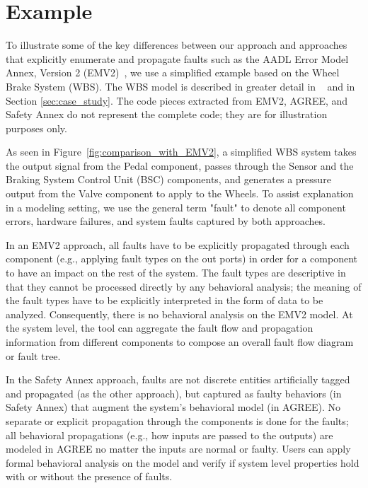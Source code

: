 \section{Example}
\label{sec:comparison_with_EMV2}

To illustrate some of the key differences between our approach and approaches that explicitly enumerate and propagate faults such as the AADL Error Model Annex, Version 2 (EMV2)~\cite{EMV2}, we use a simplified example based on the Wheel Brake System (WBS). The WBS model is described in greater detail in ~\cite{Stewart17:IMBSA} and in Section \ref{sec:case_study}. The code pieces extracted from EMV2, AGREE, and Safety Annex do not represent the complete code; they are for illustration purposes only.

As seen in Figure~\ref{fig:comparison_with_EMV2}, a simplified WBS system takes the output signal from the Pedal component, passes through the Sensor and the Braking System Control Unit (BSC) components, and generates a pressure output from the Valve component to apply to the Wheels. To assist explanation in a modeling setting, we use the general term "fault" to denote all component errors, hardware failures, and system faults captured by both approaches.

In an EMV2 approach, all faults have to be explicitly propagated through each component (e.g., applying fault types on the out ports) in order for a component to have an impact on the rest of the system. The fault types are descriptive in that they cannot be processed directly by any behavioral analysis; the meaning of the fault types have to be explicitly interpreted in the form of data to be analyzed. Consequently, there is no behavioral analysis on the EMV2 model. At the system level, the tool can aggregate the fault flow and propagation information from different components to compose an overall fault flow diagram or fault tree.

In the Safety Annex approach, faults are not discrete entities artificially tagged and propagated (as the other approach), but captured as faulty behaviors (in Safety Annex) that augment the system's behavioral model (in AGREE). No separate or explicit propagation through the components is done for the faults; all behavioral propagations (e.g., how inputs are passed to the outputs) are modeled in AGREE no matter the inputs are normal or faulty. Users can apply formal behavioral analysis on the model and verify if system level properties hold with or without the presence of faults.


